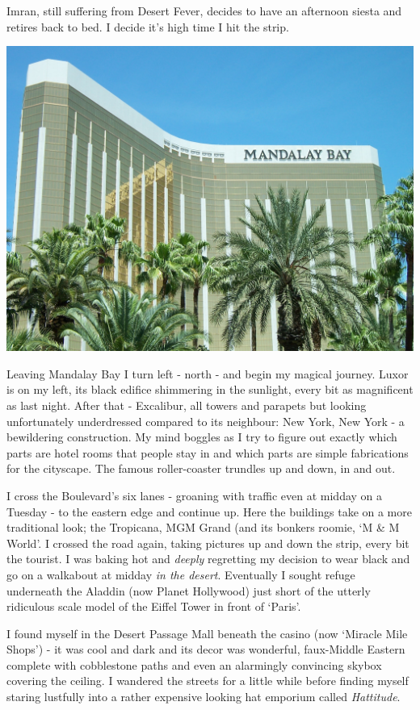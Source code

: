 \documentclass[a5paper,titlepage,11pt]{book}
\begin{document}
Imran, still suffering from Desert Fever, decides to have an afternoon siesta and retires back to bed.  I decide it's high time I hit the strip.

\begin{center}\includegraphics[width=\textwidth]{gfx/100_1388}\end{center}

Leaving Mandalay Bay I turn left - north - and begin my magical journey.  Luxor is on my left, its black edifice shimmering in the sunlight, every bit as magnificent as last night.  After that - Excalibur, all towers and parapets but looking unfortunately underdressed compared to its neighbour: New York, New York - a bewildering construction.  My mind boggles as I try to figure out exactly which parts are hotel rooms that people stay in and which parts are simple fabrications for the cityscape.  The famous roller-coaster trundles up and down, in and out.

I cross the Boulevard's six lanes - groaning with traffic even at midday on a Tuesday - to the eastern edge and continue up. Here the buildings take on a more traditional look; the Tropicana, MGM Grand (and its bonkers roomie, `M \& M World'.  I crossed the road again, taking pictures up and down the strip, every bit the tourist.  I was baking hot and \emph{deeply} regretting my decision to wear black and go on a walkabout at midday \emph{in the desert}.  Eventually I sought refuge underneath the Aladdin (now Planet Hollywood) just short of the utterly ridiculous scale model of the Eiffel Tower in front of `Paris'.

I found myself in the Desert Passage Mall beneath the casino (now `Miracle Mile Shops') - it was cool and dark and its decor was wonderful, faux-Middle Eastern complete with cobblestone paths and even an alarmingly convincing skybox covering the ceiling.  I wandered the streets for a little while before finding myself staring lustfully into a rather expensive looking hat emporium called \emph{Hattitude}.
\end{document}
